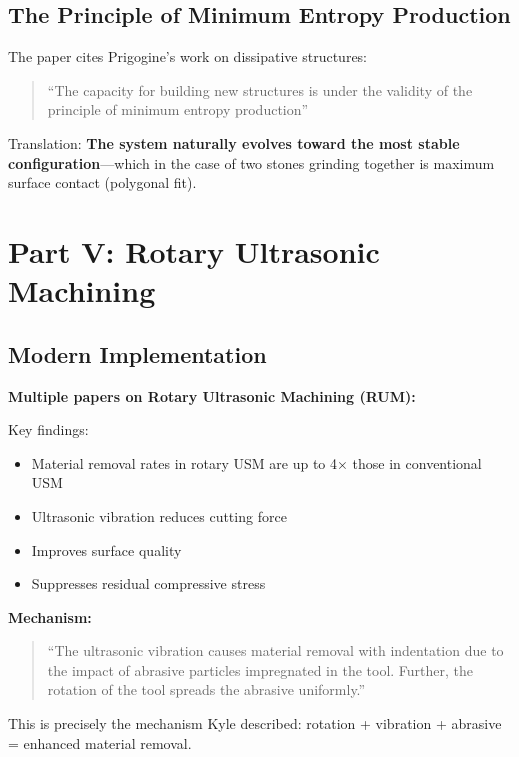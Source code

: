 \documentclass[11pt]{article}
\begin{document}
\subsection{The Principle of Minimum Entropy Production}

The paper cites Prigogine's work on dissipative structures:
\begin{quote}
``The capacity for building new structures is under the validity of the principle of minimum entropy production''
\end{quote}

Translation: \textbf{The system naturally evolves toward the most stable configuration}---which in the case of two stones grinding together is maximum surface contact (polygonal fit).

\section{Part V: Rotary Ultrasonic Machining}

\subsection{Modern Implementation}

\textbf{Multiple papers on Rotary Ultrasonic Machining (RUM):}

Key findings:
\begin{itemize}
    \item Material removal rates in rotary USM are up to 4$\times$ those in conventional USM
    \item Ultrasonic vibration reduces cutting force
    \item Improves surface quality
    \item Suppresses residual compressive stress
\end{itemize}

\textbf{Mechanism:}
\begin{quote}
``The ultrasonic vibration causes material removal with indentation due to the impact of abrasive particles impregnated in the tool. Further, the rotation of the tool spreads the abrasive uniformly.''
\end{quote}

This is precisely the mechanism Kyle described: rotation + vibration + abrasive = enhanced material removal.
\end{document}
